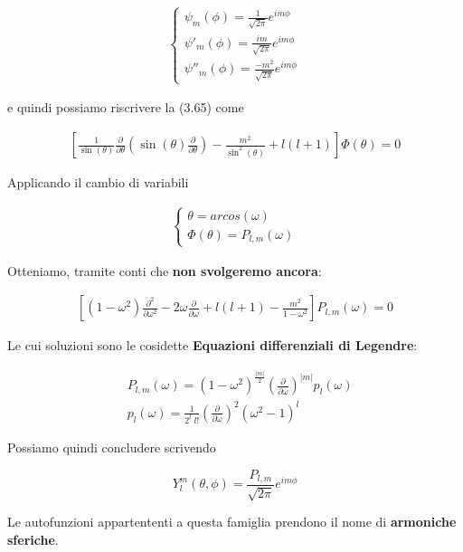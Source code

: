 \begin{align}
\left\{\begin{array}{ccc}
\psi_m(\phi)= \frac{1}{\sqrt{2\pi}} e^{i m \phi} \\
\psi'_m(\phi)= \frac{i m}{\sqrt{2\pi}} e^{i m \phi} \\
\psi''_m(\phi)= \frac{-m^2}{\sqrt{2\pi}} e^{i m \phi}
\end{array}\right. 
\end{align}

e quindi possiamo riscrivere la (3.65) come

\begin{align}
\left[
\frac{1}{\sin(\theta)}\frac{\partial}{\partial \theta}\left(\sin(\theta)\frac{\partial}{\partial \theta}\right)
 - \frac{m^2}{\sin^2(\theta)} + l(l+1) \right]\Phi(\theta)=0
\end{align}
 
Applicando il cambio di variabili

\begin{align}
\left\{\begin{array}{ccc}
\theta= arcos(\omega)\\
\Phi(\theta)= P_{l,m}(\omega)
\end{array}\right. 
\end{align}

Otteniamo, tramite conti che \textbf{non svolgeremo ancora}:

\begin{align}
\left[
(1 - \omega^2)\frac{\partial^2}{\partial \omega^2} - 2\omega \frac{\partial}{\partial \omega}+ l(l+1) - \frac{m^2}{1-\omega^2} \right]P_{l,m}(\omega)=0
\end{align}

Le cui soluzioni sono le cosidette \textbf{Equazioni differenziali di Legendre}:

\begin{align}
{}&P_{l,m}(\omega) = (1 - \omega^2)^{\frac{|m|}{2}} \left( \frac{\partial}{\partial \omega} \right)^{|m|}p_l(\omega) \\
&p_l(\omega)=\frac{1}{2^l \; l!} \left( \frac{\partial}{\partial \omega} \right)^2 (\omega^2 -1)^l
\end{align}

Possiamo quindi concludere scrivendo

\begin{equation}
Y_l^m(\theta, \phi)= \frac{P_{l,m}}{\sqrt{2\pi}}e^{im\phi}
\end{equation}

Le autofunzioni appartententi a questa famiglia prendono il nome di \textbf{armoniche sferiche}.

